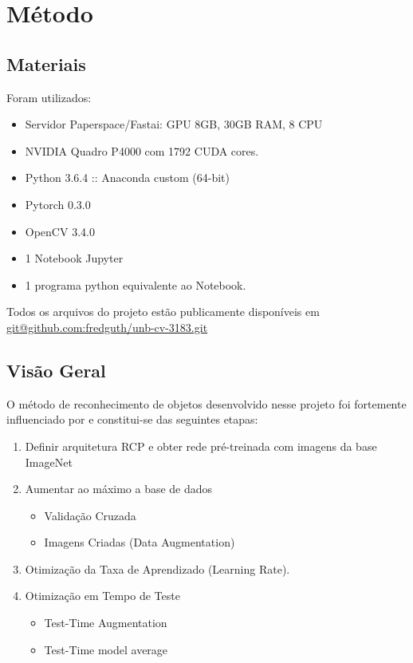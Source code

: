 \documentclass[conference]{IEEEtran}
\begin{document}
\section{Método}\label{metodologia}

\subsection{Materiais}
Foram utilizados:
\begin{itemize}
\item Servidor Paperspace/Fastai: GPU 8GB, 30GB RAM, 8 CPU
\item NVIDIA Quadro P4000 com 1792 CUDA cores.
\item Python 3.6.4 :: Anaconda custom (64-bit)
\item Pytorch 0.3.0
\item OpenCV 3.4.0
\item 1 Notebook Jupyter
\item 1 programa python equivalente ao Notebook.
\end{itemize}
Todos os arquivos do projeto estão publicamente disponíveis em  \url{git@github.com:fredguth/unb-cv-3183.git}\label{repo}

\subsection{Visão Geral}
O método de reconhecimento de objetos desenvolvido nesse projeto foi fortemente influenciado por \cite{fastai} e constitui-se das seguintes etapas:

 \begin{enumerate}
  \item Definir arquitetura RCP e obter rede pré-treinada com imagens da base ImageNet
  \item Aumentar ao máximo a base de dados
  \begin{itemize}
    \item Validação Cruzada
    \item Imagens Criadas (Data Augmentation)
  \end{itemize}
  \item Otimização da Taxa de Aprendizado (Learning Rate).
  \item Otimização em Tempo de Teste
    \begin{itemize}
    \item Test-Time Augmentation
    \item Test-Time model average
   \end{itemize}
\end{enumerate}
\end{document}
